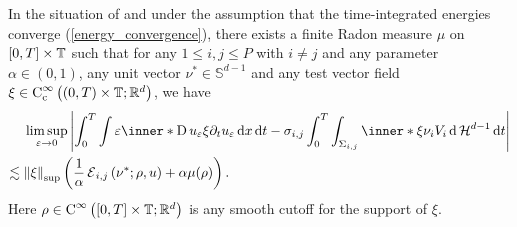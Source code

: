 \begin{proposition}
	\label{convergence_of_velocity_multiphase}
	In the situation of  and under 
	the assumption that the time-integrated energies converge 
	(\ref{energy_convergence}), there exists a finite Radon measure $ \mu $ on 
	$ [ 0 , T ] \times \operatorname{\mathbb{T}} $ such that for any $ 1 \leq i , j \leq P $ 
	with $ i \neq j $ and any parameter $ \alpha \in ( 0 , 1 ) $,  any unit 
	vector $ \nu^{ \ast } \in \mathbb{ S }^{ d - 1 } $ and any test vector 
	field $ \xi \in \operatorname{C}_{ \mathrm{c} }^{ \infty } \left( ( 0 , T ) \times 
	\operatorname{\mathbb{T}} ; \mathbb{ R }^{ d } \right) $, we have
	\begin{align*}
		& \limsup_{ \varepsilon \to 0 }
			\abs{
				\int_{ 0 }^{ T }
					\int
						\varepsilon
						\inner*{ \diff u_{ \varepsilon } \xi }
						{ \partial_{ t } u_{ \varepsilon } }
					\dd{ x }
				\dd{ t }
				-
				\sigma_{ i , j }
				\int_{ 0 }^{ T }
					\int_{ \Sigma_{ i , j } }
						\inner*{ \xi }{ \nu_{ i } } V_{ i }
					\dd{ \hm^{ d - 1 } }
				\dd{ t }
			}
		\\
		\lesssim{} &
		\norm{ \xi }_{ \mathrm{sup} }
		\left(
			\frac{ 1 }{ \alpha } \tilt_excess_{ i , j } \left( \nu^{ \ast } ; 
			\rho , u \right) 
			+ \alpha \mu ( \rho ) 
		\right).
	\end{align*}
	Here $ \rho \in \operatorname{C}^{ \infty } \left( [ 0 , T ] \times \operatorname{\mathbb{T}} ;  
	\mathbb{ R }^{ d } 
	\right) $ is any 
	smooth cutoff for the support of $ \xi $.
\end{proposition}

